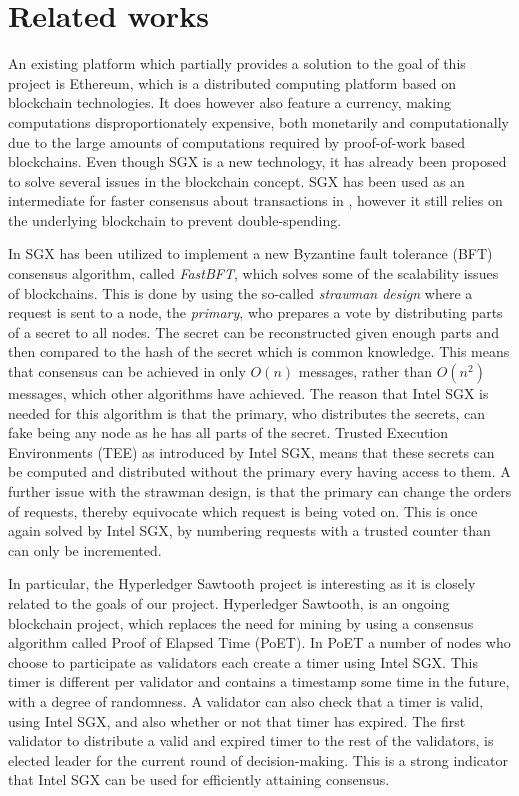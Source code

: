 \documentclass[12pt]{article}
\begin{document}
	\section{Related works}

	An existing platform which partially provides a solution to the goal of this project is Ethereum\cite{ethereum-white-paper}, which is a distributed computing platform based on blockchain technologies.
	It does however also feature a currency, making computations disproportionately expensive, both monetarily and computationally due to the large amounts of computations required by proof-of-work based blockchains.
	Even though SGX is a new technology, it has already been proposed to solve several issues in the blockchain concept. 
	SGX has been used as an intermediate for faster consensus about transactions in \cite{improv-btc}, however it still relies on the underlying blockchain to prevent double-spending.

	In \cite{fastbft} SGX has been utilized to implement a new Byzantine fault tolerance (BFT) consensus algorithm, called \textit{FastBFT}, which solves some of the scalability issues of blockchains.
	This is done by using the so-called \textit{strawman design} where a request is sent to a node, the \textit{primary}, who prepares a vote by distributing parts of a secret to all nodes.
	The secret can be reconstructed given enough parts and then compared to the hash of the secret which is common knowledge.
	This means that consensus can be achieved in only $O(n)$ messages, rather than $O(n^2)$ messages, which other algorithms have achieved.
	The reason that Intel SGX is needed for this algorithm is that the primary, who distributes the secrets, can fake being any node as he has all parts of the secret.
	Trusted Execution Environments (TEE) as introduced by Intel SGX, means that these secrets can be computed and distributed without the primary every having access to them.
	A further issue with the strawman design, is that the primary can change the orders of requests, thereby equivocate which request is being voted on.
	This is once again solved by Intel SGX, by numbering requests with a trusted counter than can only be incremented.

	In particular, the Hyperledger Sawtooth \cite{poet} project is interesting as it is closely related to the goals of our project.
	Hyperledger Sawtooth, is an ongoing blockchain project, which replaces the need for mining by using a consensus algorithm called Proof of Elapsed Time (PoET).
	In PoET a number of nodes who choose to participate as validators each create a timer using Intel SGX.
	This timer is different per validator and contains a timestamp some time in the future, with a degree of randomness.
	A validator can also check that a timer is valid, using Intel SGX, and also whether or not that timer has expired.
	The first validator to distribute a valid and expired timer to the rest of the validators, is elected leader for the current round of decision-making.	
	This is a strong indicator that Intel SGX can be used for efficiently attaining consensus.
\end{document}
